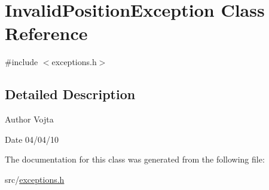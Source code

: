 \hypertarget{class_invalid_position_exception}{
\section{InvalidPositionException Class Reference}
\label{class_invalid_position_exception}
}


{\ttfamily \#include $<$exceptions.h$>$}



\subsection{Detailed Description}
\begin{DoxyAuthor}{Author}
Vojta 
\end{DoxyAuthor}
\begin{DoxyDate}{Date}
04/04/10 
\end{DoxyDate}


The documentation for this class was generated from the following file:\begin{DoxyCompactItemize}
\item 
src/\hyperlink{exceptions_8h}{exceptions.h}\end{DoxyCompactItemize}
